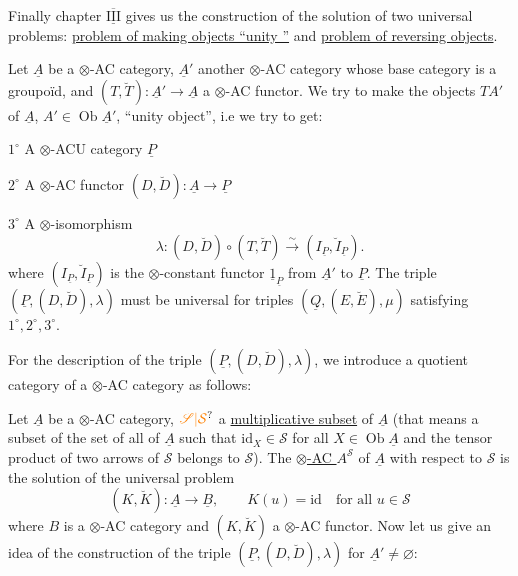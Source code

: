 Finally chapter $\overline{\underline{\mathrm{III}}}$ gives us the construction of the solution of two universal problems: \uline{problem of making objects ``unity ''} and \uline{problem of reversing objects}.

Let $\underline A$ be a $\otimes$-AC category, $\underline A'$ another $\otimes$-AC category whose base category is a groupoïd, and $(T,\breve T):\underline A'\to\underline A$ a $\otimes$-AC functor. We try to make the objects $TA'$ of $\underline A$, $A'\in\operatorname{Ob}\underline A'$, ``unity object'',
i.e we try to get:

$1^\circ$ A $\otimes$-ACU category $\underline P$

$2^\circ$ A $\otimes$-AC functor $(D,\breve D):\underline A\to\underline P$

$3^\circ$ A $\otimes$-isomorphism
\[
\lambda:(D,\breve D)\circ(T,\breve T)\xrightarrow{\sim}(I_{\underline P},\breve I_{\underline P}).
\]
where $(I_{\underline P},\breve I_{\underline P})$ is the $\otimes$-constant functor $\underline{1}_{\underline P}$ from $\underline A'$ to $\underline P$. The triple $(\underline P,(D,\breve D),\lambda)$ must be universal for triples $(\underline Q,(E,\breve E),\mu)$ satisfying $1^\circ,2^\circ,3^\circ$.

For the description of the triple $(\underline P,(D,\breve D),\lambda)$, we introduce \margin{$\big|$}a quotient category of a $\otimes$-AC category as follows:

Let $\underline A$ be a $\otimes$-AC category, $\unsure{\mathscr S|\mathcal S}$ a \uline{multiplicative subset} of $\underline A$ (that means a subset of the set of all  of $\underline A$
such that $\mathrm{id}_X\in\mathscr S$ for all $X\in\operatorname{Ob}\underline A$ and the tensor product of two arrows of $\mathscr S$ belongs to $\mathscr S$). The \uline{$\otimes$-AC \mbox{}} $A^{\mathscr S}$ of $\underline A$ with respect to $\mathscr S$ is the solution of the universal problem
\[
(K,\breve K):\underline A\longrightarrow\underline B,\qquad K(u)=\mathrm{id}\quad\text{for all }u\in\mathscr S
\]
where $B$ is a $\otimes$-AC category and $(K,\breve K)$ a $\otimes$-AC functor.
Now let us give an idea of the construction of the triple $(\underline P,(D,\breve D),\lambda)$ for $\underline A'\ne\varnothing$:


